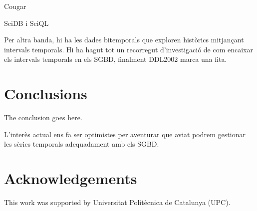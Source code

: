 \documentclass{scrartcl}
\begin{document}
Cougar 



SciDB i SciQL





Per altra banda, hi ha les dades bitemporals que exploren històrics mitjançant intervals temporals. Hi ha hagut tot un recorregut d'investigació de com encaixar  els intervals temporals en els SGBD, finalment DDL2002 marca una fita.



\section{Conclusions} 
The conclusion goes here.

L'interès actual ens fa ser optimistes per aventurar que aviat podrem gestionar les sèries temporals adequadament amb els SGBD.



\section*{Acknowledgements}

This work was supported by Universitat Polit\`{e}cnica de Catalunya (UPC).
\end{document}
